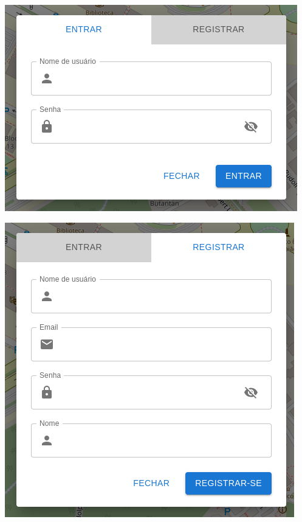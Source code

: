 \begin{multicols}{2}
    \centering
    \vspace*{\fill}
    \includegraphics[width=.9\linewidth]{figuras/loginModal.png}
    \vspace*{\fill}

    \columnbreak

    \vspace*{\fill}
    \includegraphics[width=.9\linewidth]{figuras/registrationModal.png}
    \vspace*{\fill}
\end{multicols}

